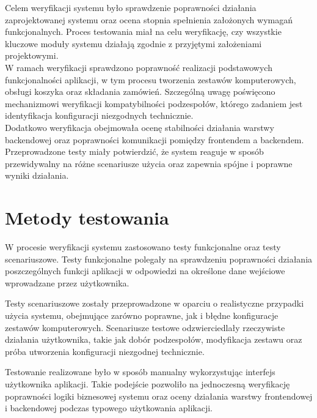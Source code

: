 \documentclass[a4paper,twoside,12pt]{book}
\begin{document}
Celem weryfikacji systemu było sprawdzenie poprawności działania zaprojektowanej
systemu oraz ocena stopnia spełnienia założonych wymagań funkcjonalnych.
Proces testowania miał na celu weryfikację, czy wszystkie kluczowe moduły
systemu działają zgodnie z przyjętymi założeniami projektowymi.
\vspace{0.5cm}
\\
W ramach weryfikacji sprawdzono poprawność realizacji podstawowych
funkcjonalności aplikacji, w tym procesu tworzenia zestawów komputerowych,
obsługi koszyka oraz składania zamówień. Szczególną uwagę poświęcono
mechanizmowi weryfikacji kompatybilności podzespołów, którego zadaniem jest
identyfikacja konfiguracji niezgodnych technicznie.
\vspace{0.5cm}
\\
Dodatkowo weryfikacja obejmowała ocenę stabilności działania warstwy
backendowej oraz poprawności komunikacji pomiędzy frontendem a backendem.
Przeprowadzone testy miały potwierdzić, że system reaguje w sposób przewidywalny
na różne scenariusze użycia oraz zapewnia spójne i poprawne wyniki działania.


\section{Metody testowania}

W procesie weryfikacji systemu zastosowano testy funkcjonalne oraz testy
scenariuszowe. Testy funkcjonalne polegały na sprawdzeniu poprawności działania
poszczególnych funkcji aplikacji w odpowiedzi na określone dane wejściowe
wprowadzane przez użytkownika.

Testy scenariuszowe zostały przeprowadzone w oparciu o realistyczne przypadki
użycia systemu, obejmujące zarówno poprawne, jak i błędne konfiguracje zestawów
komputerowych. Scenariusze testowe odzwierciedlały rzeczywiste działania
użytkownika, takie jak dobór podzespołów, modyfikacja zestawu oraz próba
utworzenia konfiguracji niezgodnej technicznie.

Testowanie realizowane było w sposób manualny wykorzystując interfejs użytkownika
aplikacji. Takie podejście pozwoliło na jednoczesną weryfikację poprawności
logiki biznesowej systemu oraz oceny działania warstwy frontendowej i
backendowej podczas typowego użytkowania aplikacji.
\end{document}
